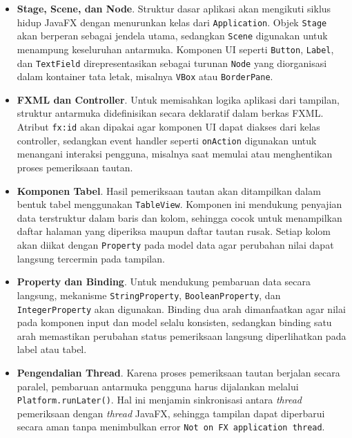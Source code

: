 \begin{itemize}
  \item \textbf{Stage, Scene, dan Node}. Struktur dasar aplikasi akan mengikuti siklus hidup JavaFX dengan menurunkan kelas dari \texttt{Application}. Objek \texttt{Stage} akan berperan sebagai jendela utama, sedangkan \texttt{Scene} digunakan untuk menampung keseluruhan antarmuka. Komponen UI seperti \texttt{Button}, \texttt{Label}, dan \texttt{TextField} direpresentasikan sebagai turunan \texttt{Node} yang diorganisasi dalam kontainer tata letak, misalnya \texttt{VBox} atau \texttt{BorderPane}.

  \item \textbf{FXML dan Controller}. Untuk memisahkan logika aplikasi dari tampilan, struktur antarmuka didefinisikan secara deklaratif dalam berkas FXML. Atribut \texttt{fx:id} akan dipakai agar komponen UI dapat diakses dari kelas controller, sedangkan event handler seperti \texttt{onAction} digunakan untuk menangani interaksi pengguna, misalnya saat memulai atau menghentikan proses pemeriksaan tautan.

  \item \textbf{Komponen Tabel}. Hasil pemeriksaan tautan akan ditampilkan dalam bentuk tabel menggunakan \texttt{TableView}. Komponen ini mendukung penyajian data terstruktur dalam baris dan kolom, sehingga cocok untuk menampilkan daftar halaman yang diperiksa maupun daftar tautan rusak. Setiap kolom akan diikat dengan \texttt{Property} pada model data agar perubahan nilai dapat langsung tercermin pada tampilan.

  \item \textbf{Property dan Binding}. Untuk mendukung pembaruan data secara langsung, mekanisme \texttt{StringProperty}, \texttt{BooleanProperty}, dan \texttt{IntegerProperty} akan digunakan. Binding dua arah dimanfaatkan agar nilai pada komponen input dan model selalu konsisten, sedangkan binding satu arah memastikan perubahan status pemeriksaan langsung diperlihatkan pada label atau tabel.

  \item \textbf{Pengendalian Thread}. Karena proses pemeriksaan tautan berjalan secara paralel, pembaruan antarmuka pengguna harus dijalankan melalui \texttt{Platform.runLater()}. Hal ini menjamin sinkronisasi antara \textit{thread} pemeriksaan dengan \textit{thread} JavaFX, sehingga tampilan dapat diperbarui secara aman tanpa menimbulkan error \texttt{Not on FX application thread}.
\end{itemize}

